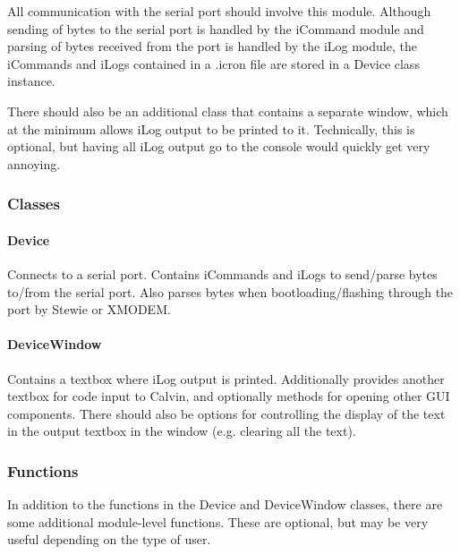 \documentclass[12pt,letterpaper]{article}
\begin{document}
All communication with the serial port should involve this module. Although sending of bytes to the serial port is handled by the iCommand module and parsing of bytes received from the port is handled by the iLog module, the iCommands and iLogs contained in a .icron file are stored in a Device class instance.

There should also be an additional class that contains a separate window, which at the minimum allows iLog output to be printed to it. Technically, this is optional, but having all iLog output go to the console would quickly get very annoying.

\setcounter{subsubsection}{-1}



%
%
\subsubsection{Classes}
\label{4.3.0}

\setcounter{paragraph}{-1}



%
%
\paragraph{Device}
\label{4.3.0.0}

Connects to a serial port. Contains iCommands and iLogs to send/parse bytes to/from the serial port. Also parses bytes when bootloading/flashing through the port by Stewie or XMODEM.



%
%
\paragraph{DeviceWindow}
\label{4.3.0.1}

Contains a textbox where iLog output is printed. Additionally provides another textbox for code input to Calvin, and optionally methods for opening other GUI components. There should also be options for controlling the display of the text in the output textbox in the window (e.g. clearing all the text).



%
%
\subsubsection{Functions}
\label{4.3.1}

In addition to the functions in the Device and DeviceWindow classes, there are some additional module-level functions. These are optional, but may be very useful depending on the type of user.
\end{document}
